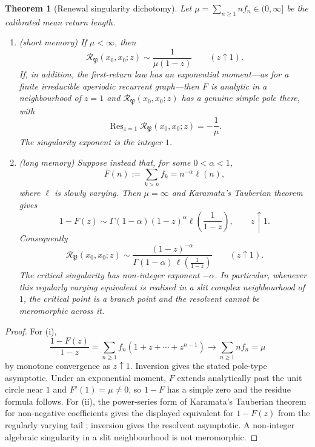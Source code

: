 \documentclass[11pt]{article}
\newtheorem{theorem}{Theorem}[section]
\theoremstyle{definition}
\theoremstyle{remark}
\newcommand{\Acc}{\mathcal{R}}
\newcommand{\Pp}{\mathfrak{P}}
\newcommand{\Res}{\operatorname{Res}}
\begin{document}
\begin{theorem}[Renewal singularity dichotomy]
\label{thm:renewal-dichotomy}
Let $\mu=\sum_{n\geq1}n f_n\in(0,\infty]$ be the calibrated mean return length.
\begin{enumerate}[label=\textup{(\roman*)},leftmargin=2.4em]
\item \textup{(short memory)} If $\mu<\infty$, then
      \[
        \Acc_{\Pp}(x_0,x_0;z)\sim\frac{1}{\mu(1-z)}
        \qquad (z\uparrow1).
      \]
      If, in addition, the first-return law has an exponential moment---as for
      a finite irreducible aperiodic recurrent graph---then $F$ is analytic in
      a neighbourhood of $z=1$ and $\Acc_{\Pp}(x_0,x_0;z)$ has a genuine simple
      pole there, with
      \[
        \Res_{z=1}\Acc_{\Pp}(x_0,x_0;z)=-\frac1\mu.
      \]
      The singularity exponent is the integer $1$.
\item \textup{(long memory)} Suppose instead that, for some $0<\alpha<1$,
      \[
        \overline F(n):=\sum_{k>n}f_k=n^{-\alpha}\ell(n),
      \]
      where $\ell$ is slowly varying.  Then $\mu=\infty$ and Karamata's
      Tauberian theorem gives
      \[
        1-F(z)\sim \Gamma(1-\alpha)(1-z)^\alpha
        \ell\!\left(\frac1{1-z}\right),
        \qquad z\uparrow1.
      \]
      Consequently
      \[
        \boxed{\quad
        \Acc_{\Pp}(x_0,x_0;z)\sim
        \frac{(1-z)^{-\alpha}}
        {\Gamma(1-\alpha)\,\ell\!\left(\frac1{1-z}\right)}
        \qquad(z\uparrow1).
        \quad}
      \]
      The critical singularity has non-integer exponent $-\alpha$.  In
      particular, whenever this regularly varying equivalent is realised in a
      slit complex neighbourhood of $1$, the critical point is a branch point
      and the resolvent cannot be meromorphic across it.
\end{enumerate}
\end{theorem}

\begin{proof}
For \textup{(i)},
\[
  \frac{1-F(z)}{1-z}=\sum_{n\geq1}f_n(1+z+\cdots+z^{n-1})
  \longrightarrow \sum_{n\geq1}n f_n=\mu
\]
by monotone convergence as $z\uparrow1$.  Inversion gives the stated
pole-type asymptotic.  Under an exponential moment, $F$ extends analytically
past the unit circle near $1$ and $F'(1)=\mu\neq0$, so $1-F$ has a simple zero
and the residue formula follows.  For \textup{(ii)}, the power-series form of
Karamata's Tauberian theorem for non-negative coefficients gives the displayed
equivalent for $1-F(z)$ from the regularly varying tail
\cite{binghamgoldieteugels1987,feller}; inversion gives the resolvent
asymptotic.  A non-integer algebraic singularity in a slit neighbourhood is not
meromorphic.
\end{proof}
\end{document}
